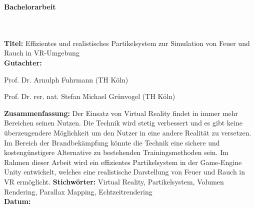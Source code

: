 \addtocounter{page}{1}

\begin{flushleft}
    \begin{huge}
        \textbf{Bachelorarbeit}
    \end{huge}
    ~\\
    ~\\
    \textbf{Titel:}  Effizientes und realistisches Partikelsystem zur Simulation von Feuer und Rauch in VR-Umgebung
    ~\\
    \doublespacing
    \textbf{Gutachter:}
    \begin{description}
        \vspace{-0.2cm}
        \itemsep-8pt
        \item[–]
            Prof. Dr. Arnulph Fuhrmann (TH Köln)
        \item[–]
            Prof. Dr. rer. nat. Stefan Michael Grünvogel (TH Köln)
    \end{description}
    \vspace{-0.5cm}
    \singlespacing
    \textbf{Zusammenfassung:} Der Einsatz von Virtual Reality findet in immer mehr Bereichen seinen Nutzen. Die Technik wird stetig verbessert und es gibt keine überzeugendere Möglichkeit um den Nutzer in eine andere Realität zu versetzen. Im Bereich der Brandbekämpfung könnte die Technik eine sichere und kostengünstigere Alternative zu bestehenden Trainingsmethoden sein. Im Rahmen dieser Arbeit wird ein effizientes Partikelsystem in der Game-Engine Unity entwickelt, welches eine realistische Darstellung von Feuer und Rauch in VR ermöglicht. \singlespacing
    \textbf{Stichwörter:} Virtual Reality, Partikelsystem, Volumen Rendering, Parallax Mapping, Echtzeitrendering\\
    \doublespacing
    \textbf{Datum:}


    \vspace{2cm}


\end{flushleft}
